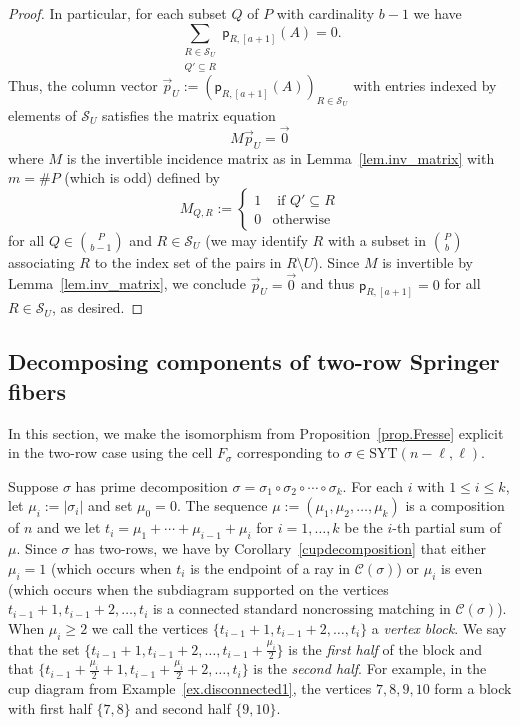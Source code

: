 \documentclass[11pt]{amsart}
\theoremstyle{remark}
\theoremstyle{remark}
\theoremstyle{definition}
\theoremstyle{definition}
\theoremstyle{definition}
\numberwithin{equation}{section}
\newcommand{\gs}{\sigma}
\newcommand{\cc}{\mathcal{C}}
\newcommand{\cs}{\mathcal{S}}
\newcommand{\SYT}{\mathrm{SYT}}
\newcommand{\pl}{\mathsf{p}}
\newcommand{\cupsigma}{\cc(\gs)}
\newcommand{\cell}{F_\gs}
\newcommand{\parsum}{t}
\begin{document}
\begin{proof}
In particular, for each subset $Q$ of $P$ with cardinality $b-1$ we have
\begin{equation}\label{eqn:GLP2}
\sum_{\substack{R\in\cs_U\\ Q'\subseteq R}}  \pl_{R,[a+1]}\left(A\right) = 0.
\end{equation}
Thus, the column vector $\vec{p}_U:=\left(\pl_{R, [a+1]}\left(A\right)\right)_{R\in\cs_U}$ with entries indexed by elements of $\cs_U$ satisfies the matrix equation
\[
M\vec{p}_U=\vec{0}
\]
where $M$ is the invertible incidence matrix as in Lemma~\ref{lem.inv_matrix} with $m= \#P$ (which is odd) defined by 
\begin{equation*}
M_{Q, R}:=\begin{cases}
        1& \text{ if } Q'\subseteq R\\
        0& \text{otherwise}
    \end{cases} 
\end{equation*}
for all $Q\in \binom{P}{b-1}$ and $R\in \cs_U$ (we may identify $R$ with a subset in $\binom{P}{b}$ associating $R$ to the index set of the pairs in $R\setminus U$).
Since $M$ is invertible by Lemma~\ref{lem.inv_matrix}, we conclude $\vec{p}_U=\vec{0}$ and thus $\pl_{R, [a+1]} = 0$ for all $R\in \cs_U$, as desired. 
\end{proof}





\subsection{Decomposing components of two-row Springer fibers}
In this section, we make the isomorphism from Proposition~\ref{prop.Fresse} explicit in the two-row case using the cell $\cell$ corresponding to $\gs\in \SYT(n-\ell, \ell)$. 

Suppose $\gs$ has prime decomposition $\gs=\gs_1\circ \gs_2 \circ \cdots \circ \gs_k$. For each $i$ with $1\leq i \leq k$, let $\mu_i:= |\gs_i|$ and set $\mu_0=0$. The sequence $\mu:=(\mu_1,\mu_2, \ldots, \mu_k)$ is a composition of $n$ and we let $\parsum_i = \mu_1+\cdots + \mu_{i-1}+\mu_i$ for $i=1, \ldots, k$ be the $i$-th partial sum of $\mu$. Since $\gs$ has two-rows, we have by Corollary~\ref{cupdecomposition} that either $\mu_i = 1$ (which occurs when $\parsum_i$ is the endpoint of a ray in $\cupsigma$) or $\mu_i$ is even (which occurs when the subdiagram supported on the vertices $\parsum_{i-1}+1, \parsum_{i-1}+2, \ldots, \parsum_i$ is a connected standard noncrossing matching in $\cupsigma$). When $\mu_i\geq 2$ we call the vertices $\{\parsum_{i-1}+1, \parsum_{i-1}+2, \ldots, \parsum_i\}$ a \emph{vertex block}. We say that the set $\{\parsum_{i-1}+1, \parsum_{i-1}+2, \ldots, \parsum_{i-1}+\frac{\mu_i}{2}\}$ is the \emph{first half} of the block and that $\{\parsum_{i-1}+\frac{\mu_i}{2}+1 , \parsum_{i-1}+\frac{\mu_i}{2}+2, \ldots, \parsum_i \}$ is the \emph{second half}. For example, in the cup diagram from Example~\ref{ex.disconnected1}, the vertices ${7,8,9,10}$ form a block with first half $\{7,8\}$ and second half $\{9,10\}$. 
\end{document}
